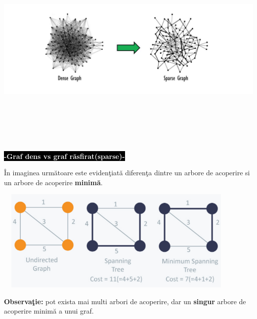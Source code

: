 \documentclass[14pt]{article}
\begin{document}
\begin{center}
   \includegraphics[width = 16cm, height = 10cm]{dense} 
\end{center}

\begin{center}
    \colorbox{black}{\textcolor{white}{ \textbf{-Graf dens vs graf r\u{a}sfirat(sparse)-}}} 
\end{center}

\^In imaginea urm\u{a}toare este eviden\c tiat\u{a} diferen\c ta dintre un arbore de acoperire si un arbore de acoperire \textbf{minim\u{a}}. 

\vspace{3mm}

\includegraphics[width = 12cm, height = 5cm]{comparison}

\vspace{2mm}

\textbf{Observa\c tie:} pot exista mai multi arbori de acoperire, dar un \textbf{singur} arbore de acoperire minim\u{a} a unui graf.

\vspace{7mm}
\end{document}
